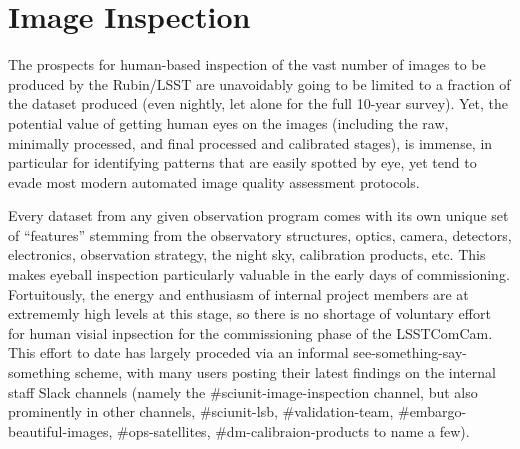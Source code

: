 \section{Image Inspection}
\label{sec:image_inspection}

The prospects for human-based inspection of the vast number of images to be
produced by the Rubin/LSST are unavoidably going to be limited to a 
fraction of the dataset produced (even nightly, let alone for the full 10-year
survey).  Yet, the potential value of getting human eyes on the images (including
the raw, minimally processed, and final processed and calibrated stages), is
immense, in particular for identifying patterns that are easily spotted by eye,
yet tend to evade most modern automated image quality assessment protocols.

Every dataset from any given observation program comes with its own unique set
of ``features'' stemming from the observatory structures, optics, camera,
detectors, electronics, observation strategy, the night sky, calibration products, 
etc.  This makes eyeball inspection particularly valuable in the early days of 
commissioning.  Fortuitously, the energy and enthusiasm of internal project members
are at extrememly high levels at this stage, so there is no shortage of voluntary
effort for human visial inpsection for the commissioning phase of the LSSTComCam.
This effort to date has largely proceded via an informal
see-something-say-something scheme, with many users posting their latest findings
on the internal staff Slack channels (namely the \#sciunit-image-inspection channel,
but also prominently in other channels, \#sciunit-lsb, \#validation-team,
\#embargo-beautiful-images, \#ops-satellites, \#dm-calibraion-products to name a few).

